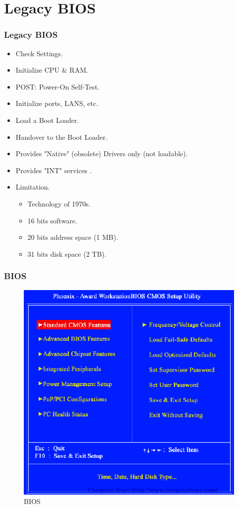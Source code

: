 \documentclass[xcolor=table, notheorems, hyperref={pdfpagelabels=false}]{beamer}
\begin{document}
\section{Legacy BIOS}
\begin{frame}
\frametitle{Legacy BIOS}
\begin{itemize}
\item Check Settings.
\item Initialize CPU \& RAM.
\item POST: Power-On Self-Test.
\item Initialize ports, LANS, etc.
\item Load a Boot Loader.
\item Handover to the Boot Loader.
\item Provides "Native" (obsolete) Drivers only (not loadable).
\item Provides "INT" services .
\item Limitation.
\begin{itemize}
\item Technology of 1970s.
\item 16 bits software.
\item 20 bits address space (1 MB).
\item 31 bits disk space (2 TB).
\end{itemize}
\end{itemize}


\end{frame}

\begin{frame}
\frametitle{BIOS}
\begin{figure}
\includegraphics[width=0.6\linewidth]{os03-BIOS}
\caption{BIOS}
\end{figure}
\end{frame}
\end{document}

